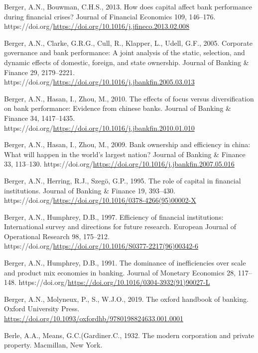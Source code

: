 \documentclass[
  12pt,
  a4paper,
  DIV=11,
  numbers=noendperiod]{scrreprt}
\newlength{\cslhangindent}
\newenvironment{CSLReferences}[2] %
 {\begin{list}{}{%
  \setlength{\itemindent}{0pt}
  \setlength{\leftmargin}{0pt}
  \setlength{\parsep}{0pt}
  \ifodd #1
   \setlength{\leftmargin}{\cslhangindent}
   \setlength{\itemindent}{-1\cslhangindent}
  \fi
  \setlength{\itemsep}{#2\baselineskip}}}
 {\end{list}}
\begin{document}
\begin{CSLReferences}{1}{0}
Berger, A.N., Bouwman, C.H.S., 2013. How does capital affect bank
performance during financial crises? Journal of Financial Economics 109,
146--176.
https://doi.org/\url{https://doi.org/10.1016/j.jfineco.2013.02.008}

Berger, A.N., Clarke, G.R.G., Cull, R., Klapper, L., Udell, G.F., 2005.
Corporate governance and bank performance: A joint analysis of the
static, selection, and dynamic effects of domestic, foreign, and state
ownership. Journal of Banking \& Finance 29, 2179--2221.
https://doi.org/\url{https://doi.org/10.1016/j.jbankfin.2005.03.013}

Berger, A.N., Hasan, I., Zhou, M., 2010. The effects of focus versus
diversification on bank performance: Evidence from chinese banks.
Journal of Banking \& Finance 34, 1417--1435.
https://doi.org/\url{https://doi.org/10.1016/j.jbankfin.2010.01.010}

Berger, A.N., Hasan, I., Zhou, M., 2009. Bank ownership and efficiency
in china: What will happen in the world's largest nation? Journal of
Banking \& Finance 33, 113--130.
https://doi.org/\url{https://doi.org/10.1016/j.jbankfin.2007.05.016}

Berger, A.N., Herring, R.J., Szegö, G.P., 1995. The role of capital in
financial institutions. Journal of Banking \& Finance 19, 393--430.
https://doi.org/\url{https://doi.org/10.1016/0378-4266(95)00002-X}

Berger, A.N., Humphrey, D.B., 1997. Efficiency of financial
institutions: International survey and directions for future research.
European Journal of Operational Research 98, 175--212.
https://doi.org/\url{https://doi.org/10.1016/S0377-2217(96)00342-6}

Berger, A.N., Humphrey, D.B., 1991. The dominance of inefficiencies over
scale and product mix economies in banking. Journal of Monetary
Economics 28, 117--148.
https://doi.org/\url{https://doi.org/10.1016/0304-3932(91)90027-L}

Berger, A.N., Molyneux, P., S., W.J.O., 2019. The oxford handbook of
banking. Oxford University Press.
\url{https://doi.org/10.1093/oxfordhb/9780198824633.001.0001}

Berle, A.A., Means, G.C.(Gardiner.C., 1932. The modern corporation and
private property. Macmillan, New York.


\end{CSLReferences}
\end{document}
